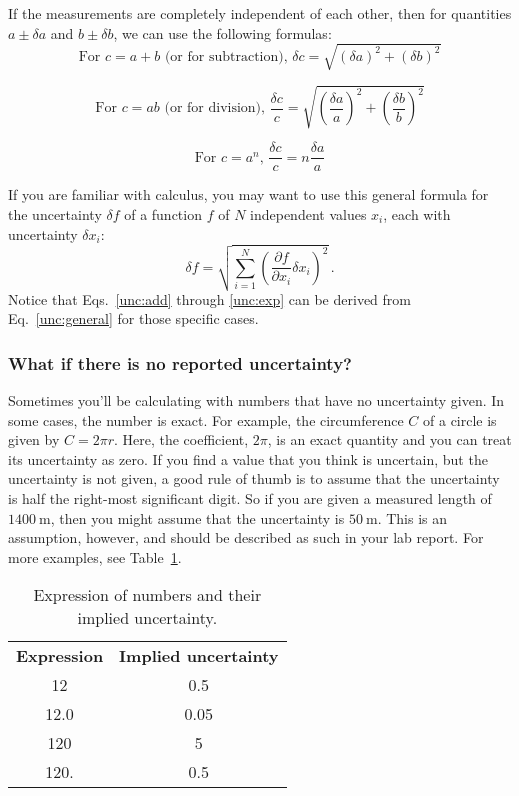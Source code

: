 If the measurements are completely independent of each other, then for quantities $a \pm \delta a$ and $b \pm \delta b$, we can use the following formulas:
\begin{equation}\label{unc:add}
\textrm{For } c = a + b \textrm{ (or for subtraction), } \delta c = \sqrt{(\delta a)^2 + (\delta b)^2}
\end{equation}

\begin{equation}\label{unc:mult}
\textrm{For } c = ab \textrm{ (or for division), } \frac{\delta c}{c} = \sqrt{\left(\frac{\delta a}{a}\right)^2 + \left(\frac{\delta b}{b}\right)^2}
\end{equation}

\begin{equation}\label{unc:exp}
\textrm{For } c = a^n,\, \frac{\delta c}{c} = n \frac{\delta a}{a}
\end{equation}

If you are familiar with calculus, you may want to use this general formula for the uncertainty $\delta f$ of a function $f$ of $N$ independent values $x_i$, each with uncertainty $\delta x_i$:
\begin{equation}\label{unc:general}
\delta f = \sqrt{ \sum_{i=1}^{N} \left(\frac{\partial f}{\partial x_i} \delta x_i\right)^2 } \, .
\end{equation}
Notice that Eqs.\ \ref{unc:add} through \ref{unc:exp} can be derived from Eq.\ \ref{unc:general} for those specific cases.

\subsubsection{What if there is no reported uncertainty?}

Sometimes you'll be calculating with numbers that have no uncertainty given.
In some cases, the number is exact.
For example, the circumference $C$ of a circle is given by $C = 2 \pi r$. Here, the coefficient, $2\pi$, is an exact quantity and you can treat its uncertainty as zero.
If you find a value that you think is uncertain, but the uncertainty is not given, a good rule of thumb is to assume that the uncertainty is half the right-most significant digit.
So if you are given a measured length of $1400\:$m, then you might assume that the uncertainty is $50\:$m.
This is an assumption, however, and should be described as such in your lab report.
For more examples, see Table~\ref{unc:tab:implied}.

\begin{table}
	\begin{center}
		\begin{tabular}{cc}
			\textbf{Expression} & \textbf{Implied uncertainty} \\
			12 & 0.5 \\
			12.0 & 0.05 \\
			120 & 5 \\
			120. & 0.5
		\end{tabular}
		\caption{Expression of numbers and their implied uncertainty.}\label{unc:tab:implied}
	\end{center}
\end{table}

